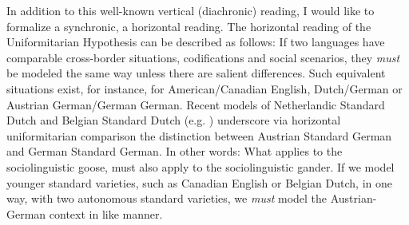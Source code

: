 \documentclass[output=paper]{langscibook}
\begin{document}
In addition to this well-known vertical (diachronic) reading, I would like to formalize a synchronic, a horizontal reading. The horizontal reading of the Uniformitarian Hypothesis \citep[110--111]{Dollinger2019c} can be described as follows: If two languages have comparable cross-border situations, codifications and social scenarios, they \textit{must} be modeled the same way unless there are salient differences. Such equivalent situations exist, for instance, for American/Canadian English, Dutch/German or Austrian German/German German. Recent models of Netherlandic Standard Dutch and Belgian Standard Dutch (e.g. \citealt{DeRidder2020}) underscore via horizontal uniformitarian comparison the distinction between Austrian Standard German and German Standard German. In other words: What applies to the sociolinguistic goose, must also apply to the sociolinguistic gander. If we model younger standard varieties, such as Canadian English or Belgian Dutch, in one way, with two autonomous standard varieties, we \textit{must} model the Austrian-German context in like manner.
\end{document}
